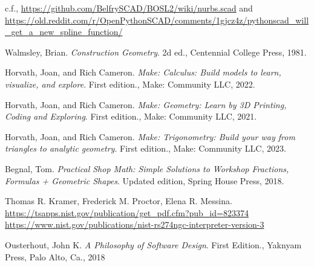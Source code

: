 \documentclass{ltxdoc}
\begin{document}
c.f., \url{https://github.com/BelfrySCAD/BOSL2/wiki/nurbs.scad} and \url{https://old.reddit.com/r/OpenPythonSCAD/comments/1gjcz4z/pythonscad_will_get_a_new_spline_function/}



\begin{thebibliography}{Ousterhout2018APO}

Walmsley, Brian. \emph{Construction Geometry}. 2d ed., Centennial College Press, 1981.
 
Horvath, Joan, and Rich Cameron. 
\emph{Make: Calculus: Build models to learn, visualize, and explore}. First edition., 
Make: Community LLC, 2022.
 
Horvath, Joan, and Rich Cameron. 
\emph{Make: Geometry: Learn by 3D Printing, Coding and Exploring}. First edition., 
Make: Community LLC, 2021.

Horvath, Joan, and Rich Cameron. 
\emph{Make: Trigonometry: Build your way from triangles to analytic geometry}. First edition., 
Make: Community LLC, 2023.
 
Begnal, Tom. \emph{Practical Shop Math: Simple Solutions to Workshop Fractions, Formulas + Geometric Shapes}. Updated edition, Spring House Press, 2018.
 
Thomas R. Kramer, Frederick M. Proctor, Elena R. Messina.\\
\mbox{\url{https://tsapps.nist.gov/publication/get_pdf.cfm?pub_id=823374}}\\
\url{https://www.nist.gov/publications/nist-rs274ngc-interpreter-version-3}

Ousterhout, John K.
\emph{A Philosophy of Software Design}. First Edition., Yaknyam Press, Palo Alto, Ca., 2018



\end{thebibliography}


\createindexes

 

 
\end{document}
